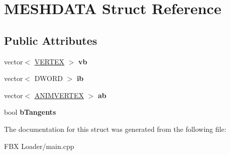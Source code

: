 \hypertarget{struct_m_e_s_h_d_a_t_a}{}\section{M\+E\+S\+H\+D\+A\+TA Struct Reference}
\label{struct_m_e_s_h_d_a_t_a}
\subsection*{Public Attributes}
\begin{DoxyCompactItemize}
\item 
vector$<$ \hyperlink{struct_v_e_r_t_e_x}{V\+E\+R\+T\+EX} $>$ {\bfseries vb}\hypertarget{struct_m_e_s_h_d_a_t_a_a0eff5148d4698917753954e2c742709c}{}\label{struct_m_e_s_h_d_a_t_a_a0eff5148d4698917753954e2c742709c}

\item 
vector$<$ D\+W\+O\+RD $>$ {\bfseries ib}\hypertarget{struct_m_e_s_h_d_a_t_a_a0a7f92054ee297df61f63d7a4c01a69d}{}\label{struct_m_e_s_h_d_a_t_a_a0a7f92054ee297df61f63d7a4c01a69d}

\item 
vector$<$ \hyperlink{struct_a_n_i_m_v_e_r_t_e_x}{A\+N\+I\+M\+V\+E\+R\+T\+EX} $>$ {\bfseries ab}\hypertarget{struct_m_e_s_h_d_a_t_a_ad96a78a5092cdeecddd9690e86006fe1}{}\label{struct_m_e_s_h_d_a_t_a_ad96a78a5092cdeecddd9690e86006fe1}

\item 
bool {\bfseries b\+Tangents}\hypertarget{struct_m_e_s_h_d_a_t_a_ab5fb01c19ad2dabdfa86b65df6ecbf99}{}\label{struct_m_e_s_h_d_a_t_a_ab5fb01c19ad2dabdfa86b65df6ecbf99}

\end{DoxyCompactItemize}


The documentation for this struct was generated from the following file\+:\begin{DoxyCompactItemize}
\item 
F\+B\+X Loader/main.\+cpp\end{DoxyCompactItemize}
